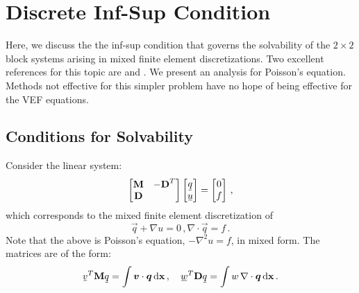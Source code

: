 \documentclass[../doc.tex]{subfiles}
\begin{document}
\section{Discrete Inf-Sup Condition} \label{rtvef_sec:infsup}
Here, we discuss the the inf-sup condition that governs the solvability of the $2\times 2$ block systems arising in mixed finite element discretizations. Two excellent references for this topic are \textcite{Brezzi2003StabilityOS} and \textcite{benzi_golub_liesen_2005}. We present an analysis for Poisson's equation. Methods not effective for this simpler problem have no hope of being effective for the VEF equations. 

\subsection{Conditions for Solvability}
Consider the linear system: 
	\begin{equation} \label{rtvef:block_sys}
		\begin{bmatrix} 
			\mat{M} & -\mat{D}^T \\ \mat{D} 			
		\end{bmatrix}
		\begin{bmatrix} 
			\ubar{q} \\ \ubar{u} 
		\end{bmatrix}
		= \begin{bmatrix} 
			0 \\ f 
		\end{bmatrix} \,, 
	\end{equation}
which corresponds to the mixed finite element discretization of 
	\begin{subequations}
	\begin{equation}
		 \vec{q} + \nabla u = 0 \,,
	\end{equation}
	\begin{equation}
		\nabla\cdot\vec{q} = f \,. 
	\end{equation}
	\end{subequations}
Note that the above is Poisson's equation, $-\nabla^2 u = f$, in mixed form. The matrices are of the form:
	\begin{equation}
		\ubar{v}^T\mat{M} \ubar{q} = \int \vec{v}\cdot\vec{q} \ud \x \,, \quad \ubar{w}^T\mat{D}\ubar{q} = \int w\,\nabla\cdot\vec{q} \ud \x \,. 
	\end{equation}
\end{document}
